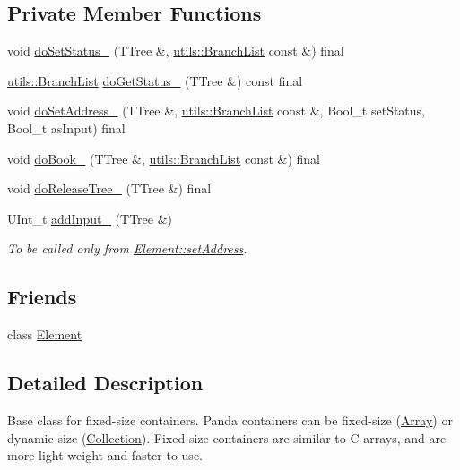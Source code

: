 \subsection*{Private Member Functions}
\begin{DoxyCompactItemize}
\item 
void \hyperlink{classpanda_1_1ArrayBase_a7c39d39cffed07ba2cffdf8828729cf7}{doSetStatus\_\-} (TTree \&, \hyperlink{classpanda_1_1utils_1_1BranchList}{utils::BranchList} const \&) final
\item 
\hyperlink{classpanda_1_1utils_1_1BranchList}{utils::BranchList} \hyperlink{classpanda_1_1ArrayBase_a945c9cf4d4a979891c11cdfca5e7241f}{doGetStatus\_\-} (TTree \&) const final
\item 
void \hyperlink{classpanda_1_1ArrayBase_a1ddaf0aff0dd758a0c4d99d0422db5b0}{doSetAddress\_\-} (TTree \&, \hyperlink{classpanda_1_1utils_1_1BranchList}{utils::BranchList} const \&, Bool\_\-t setStatus, Bool\_\-t asInput) final
\item 
void \hyperlink{classpanda_1_1ArrayBase_aecb9d88c88e0102d7c8d631a036cb338}{doBook\_\-} (TTree \&, \hyperlink{classpanda_1_1utils_1_1BranchList}{utils::BranchList} const \&) final
\item 
void \hyperlink{classpanda_1_1ArrayBase_a4fecec0749650b43c4eb3110e60fa193}{doReleaseTree\_\-} (TTree \&) final
\item 
UInt\_\-t \hyperlink{classpanda_1_1ArrayBase_af7f0227b78e78aa597170e23d471d454}{addInput\_\-} (TTree \&)
\begin{DoxyCompactList}\small\item\em To be called only from \hyperlink{classpanda_1_1Element_a0f4c9e587ee4c4ccbc27b76b06adbc80}{Element::setAddress}. \item\end{DoxyCompactList}\end{DoxyCompactItemize}
\subsection*{Friends}
\begin{DoxyCompactItemize}
\item 
class \hyperlink{classpanda_1_1ArrayBase_a016b821f88c7c0a2de1451c175cefbf9}{Element}
\end{DoxyCompactItemize}


\subsection{Detailed Description}
Base class for fixed-\/size containers. Panda containers can be fixed-\/size (\hyperlink{classpanda_1_1Array}{Array}) or dynamic-\/size (\hyperlink{classpanda_1_1Collection}{Collection}). Fixed-\/size containers are similar to C arrays, and are more light weight and faster to use. 

